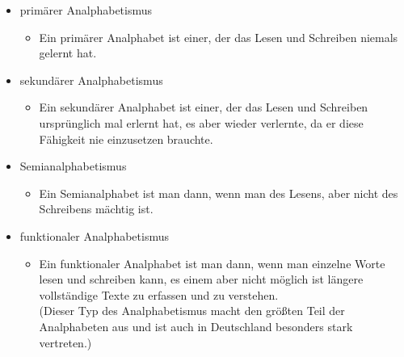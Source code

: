 \begin{itemize}
	\item primärer Analphabetismus


				\begin{itemize}


					  \item Ein primärer Analphabet ist einer, der das Lesen und Schreiben niemals gelernt hat.


				\end{itemize}


	\item sekundärer Analphabetismus


				\begin{itemize}


					  \item Ein sekundärer Analphabet ist einer, der das Lesen und Schreiben ursprünglich mal erlernt hat, es aber wieder verlernte, da er diese Fähigkeit nie einzusetzen brauchte.


				\end{itemize}


	\item Semianalphabetismus


				\begin{itemize}


					  \item Ein Semianalphabet ist man dann, wenn man des Lesens, aber nicht des Schreibens mächtig ist.


				\end{itemize}


	\item funktionaler Analphabetismus


				\begin{itemize}


					  \item Ein funktionaler Analphabet ist man dann, wenn man einzelne Worte lesen und schreiben kann, es einem aber nicht möglich ist längere vollständige Texte zu erfassen und zu verstehen.\\
						(Dieser Typ des Analphabetismus macht den größten Teil der Analphabeten aus und ist auch in Deutschland besonders stark vertreten.)


				\end{itemize}


\end{itemize}


